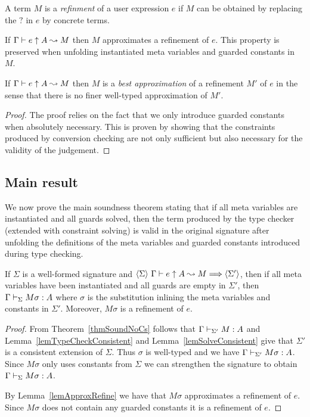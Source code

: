 \begin{definition}[Refinement]
    A term $M$ is a {\em refinment} of a user expression $e$ if $M$ can be
    obtained by replacing the $?$ in $e$ by concrete terms.
\end{definition}

\begin{lemma} \label{lemApproxRefine}
    If ${\Gamma} \vdash {e} \uparrow {A} \leadsto {M}$ then $M$ approximates a refinement of $e$. This
    property is preserved when unfolding instantiated meta variables and
    guarded constants in $M$.
\end{lemma}

\begin{lemma}
    If ${\Gamma} \vdash {e} \uparrow {A} \leadsto {M}$ then $M$ is a {\em best approximation} of a
    refinement $M'$ of $e$ in the sense that there is no finer well-typed
    approximation of $M'$.
\end{lemma}

\begin{proof}
The proof relies on the fact that we only introduce guarded constants when
absolutely necessary. This is proven by showing that the constraints produced
by conversion checking are not only sufficient but also necessary for the
validity of the judgement.
\end{proof}

\subsection{Main result}

We now prove the main soundness theorem stating that if all meta variables are
instantiated and all guards solved, then the term produced by the type checker
(extended with constraint solving) is valid in the original signature after
unfolding the definitions of the meta variables and guarded constants
introduced during type checking.

\begin{theorem} \label{thmMain}
    If $\Sigma$ is a well-formed {\Core} signature and $\langle {\Sigma} \rangle ~ {{\Gamma} \vdash {e} \uparrow {A} \leadsto {M}} \Longrightarrow \langle {\Sigma'} \rangle$, then if all meta variables have been
    instantiated and all guards are empty in $\Sigma'$, then ${\Gamma} \vdash_{\Sigma} {M\sigma} : {A}$ where $\sigma$ is the substitution inlining the meta
    variables and constants in $\Sigma'$. Moreover, $M\sigma$ is a refinement
    of $e$.
\end{theorem}

\begin{proof}
    From Theorem~\ref{thmSoundNoCs} follows that ${\Gamma} \vdash_{\Sigma'} {M} : {A}$ and Lemma~\ref{lemTypeCheckConsistent} and
    Lemma~\ref{lemSolveConsistent} give that $\Sigma'$ is a consistent
    extension of $\Sigma$.  Thus $\sigma$ is well-typed and we have ${\Gamma} \vdash_{\Sigma'} {M\sigma} : {A}$.
    Since $M\sigma$ only uses constants from $\Sigma$ we can strengthen the
    signature to obtain ${\Gamma} \vdash_{\Sigma} {M\sigma} : {A}$.

    By Lemma~\ref{lemApproxRefine} we have that $M\sigma$ approximates a
    refinement of $e$. Since $M\sigma$ does not contain any guarded constants
    it is a refinement of $e$.
\end{proof}

